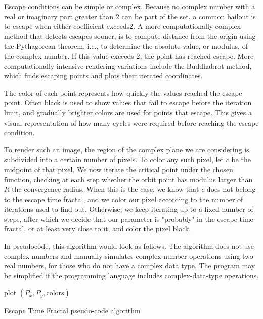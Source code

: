 	Escape conditions can be simple or complex. Because no complex number with a real or imaginary part greater than $2$ can be part of the set, a common bailout is to escape when either coefficient exceeds$ $2. A more computationally complex method that detects escapes sooner, is to compute distance from the origin using the Pythagorean theorem, i.e., to determine the absolute value, or modulus, of the complex number. If this value exceeds $2$, the point has reached escape. More computationally intensive rendering variations include the Buddhabrot method, which finds escaping points and plots their iterated coordinates.

	The color of each point represents how quickly the values reached the escape point. Often black is used to show values that fail to escape before the iteration limit, and gradually brighter colors are used for points that escape. This gives a visual representation of how many cycles were required before reaching the escape condition.

	To render such an image, the region of the complex plane we are considering is subdivided into a certain number of pixels. To color any such pixel, let $c$  be the midpoint of that pixel. We now iterate the critical point under the chosen function, checking at each step whether the orbit point has modulus larger than $R$ the convergence radius. When this is the case, we know that $c$  does not belong to the escape time fractal, and we color our pixel according to the number of iterations used to find out. Otherwise, we keep iterating up to a fixed number of steps, after which we decide that our parameter is "probably" in the escape time fractal, or at least very close to it, and color the pixel black.

	In pseudocode, this algorithm would look as follows. The algorithm does not use complex numbers and manually simulates complex-number operations using two real numbers, for those who do not have a complex data type. The program may be simplified if the programming language includes complex-data-type operations.
	
	\begin{algorithm}[H]
	 plot $(P_x,P_y,\text{colors})$\;
	 \caption{Escape Time Fractal pseudo-code algorithm}
	\end{algorithm}
	
